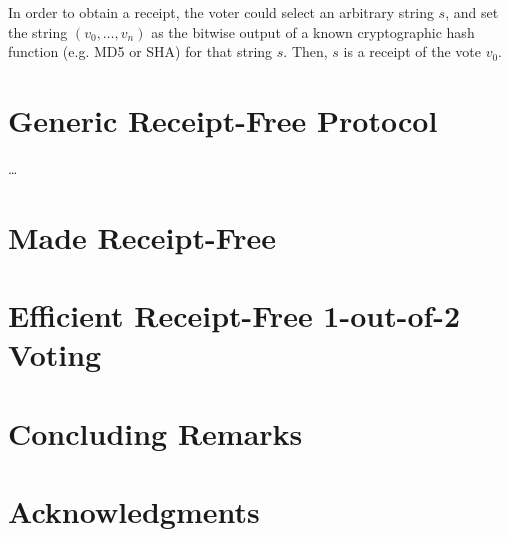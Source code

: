 \documentclass{article}
\begin{document}
In order to obtain a receipt, the voter could select an arbitrary string
$s$, and set the string $(v_0,\ldots,v_n)$ as the bitwise output of a
known cryptographic hash function (e.g. MD5 or SHA) for that string
$s$. Then, $s$ is a receipt of the vote $v_0$.



\section{Generic Receipt-Free Protocol}\label{sec:genconstr}

\ldots


\section{Made Receipt-Free}

\section{Efficient Receipt-Free 1-out-of-2 Voting}
\label{sec:eff}


\section{Concluding Remarks}

\section{Acknowledgments}
\end{document}
